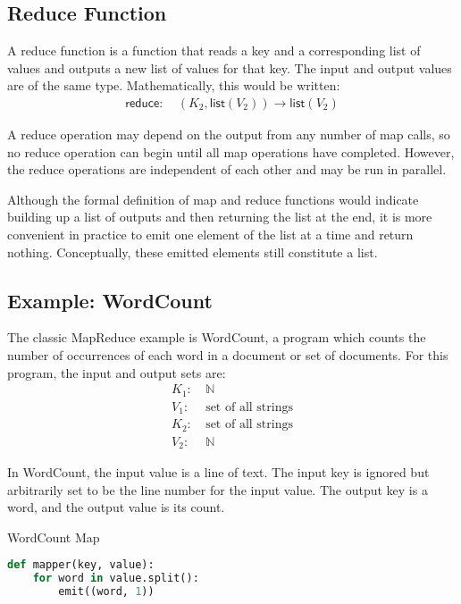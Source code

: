\documentclass[letterpaper]{sig-alternate}
\providecommand{\List}[1]{\ensuremath{\mathsf{list}(#1)}}
\providecommand{\Pair}[2]{\ensuremath{(#1, #2)}}
\providecommand{\NaturalSet}{\ensuremath{\mathbb{N}}}
\providecommand{\InputKeySet}{\ensuremath{K_1}}
\providecommand{\OutputKeySet}{\ensuremath{K_2}}
\providecommand{\InputValSet}{\ensuremath{V_1}}
\providecommand{\OutputValSet}{\ensuremath{V_2}}
\begin{document}
\subsection{Reduce Function}

A reduce function is a function that reads a key and a corresponding list of
values and outputs a new list of values for that key.  The input and output
values are of the same type.  Mathematically, this would be written:
\begin{align}
\mathsf{reduce}:\:&\Pair{\OutputKeySet}{\List{\OutputValSet}} \rightarrow
\List{\OutputValSet}
\end{align}

A reduce operation may depend on the output from any number of map calls, so
no reduce operation can begin until all map operations have completed.
However, the reduce operations are independent of each other and may be run in
parallel.

Although the formal definition of map and reduce functions would indicate
building up a list of outputs and then returning the list at the end, it is
more convenient in practice to emit one element of the list at a time and
return nothing.  Conceptually, these emitted elements still constitute a list.

\subsection{Example: WordCount}

The classic MapReduce example is WordCount, a program which counts the number
of occurrences of each word in a document or set of documents.  For this
program, the input and output sets are:
\begin{align}
\InputKeySet:\: &\NaturalSet
\label{eq:wc-inputkey}
\\
\InputValSet:\: & \text{set of all strings}
\label{eq:wc-inputval}
\\
\OutputKeySet:\: &\text{set of all strings}
\label{eq:wc-outputkey}
\\
\OutputValSet:\: &\NaturalSet
\label{eq:wc-outputval}
\end{align}

In WordCount, the input value is a line of text.  The input key is ignored but
arbitrarily set to be the line number for the input value.  The output key is
a word, and the output value is its count.

\begin{algorithm}[tbp]
\caption{WordCount Map}
\label{alg:wc-map}
\begin{lstlisting}[language=Python]
def mapper(key, value):
    for word in value.split():
        emit((word, 1))
\end{lstlisting}
\end{algorithm}
\end{document}
